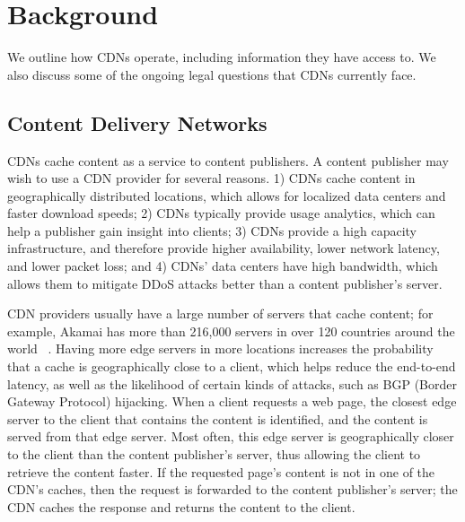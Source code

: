 \section{Background}
\label{sec:background}

We outline how CDNs operate, including information they have access to. We also discuss some of the ongoing legal questions that CDNs currently face.

\vspace{-2mm}
\subsection{Content Delivery Networks}
CDNs cache content as a service to content publishers. A 
content publisher may wish to use a CDN provider for several reasons. 1) CDNs cache content in geographically distributed locations, which allows for localized data centers and faster download speeds; 2) CDNs typically provide usage analytics, which can help a publisher gain insight into clients; 3) CDNs provide a high capacity infrastructure, and therefore provide higher availability, lower network latency, and lower packet loss; and 4) CDNs' data centers have high bandwidth, which allows them to mitigate DDoS attacks better than a content publisher's server.


CDN providers usually have a large number of servers that cache content;
for example, Akamai has more than 216,000 servers in over 120 countries around
the world~ \cite{akamai_facts}.  Having more edge servers in more locations
increases the probability that a cache is geographically close to a client,
which helps reduce the end-to-end latency, as well as the likelihood of
certain kinds of attacks, such as BGP (Border Gateway Protocol) hijacking.
When a client requests a web page, the closest edge server to the client that
contains the content is identified, and the content is served from that edge
server.  Most often, this edge server is geographically closer to the client
than the content publisher's server, thus allowing the client to retrieve the
content faster. If the requested page's content is not in one of the CDN's
caches, then the request is forwarded to the content publisher's server; the
CDN caches the response and returns the content to the client.

